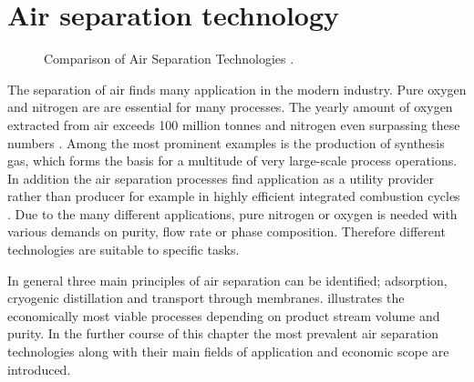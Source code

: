 \chapter{Air separation technology}
\label{chp:airsep}
\begin{figure}[h]
	
	\caption{Comparison of Air Separation Technologies \cite{Prasad.1994}.}
	\label{fig:tech_compar}
\end{figure}
The separation of air finds many application in the modern industry. Pure oxygen and nitrogen are
are essential for many processes. The yearly amount of oxygen extracted from air exceeds 100 million
tonnes and nitrogen even surpassing these numbers \cite{Emsley.2003c2001}. Among the most prominent
examples is the production of synthesis gas,
which forms the basis for a multitude of very large-scale process operations. In addition the
air separation processes find application as a utility provider rather than producer
for example in highly efficient integrated combustion cycles \cite{Mahapatra.2010}. Due to the
many different applications, pure nitrogen or oxygen is needed with various demands on
purity, flow rate or phase composition. Therefore different technologies are suitable to specific tasks.

In general three main principles of air separation can be identified; adsorption,
cryogenic distillation and transport through membranes.  illustrates the
economically most viable processes depending on product stream volume and purity.
In the further course of this chapter the most prevalent  air separation technologies
along with their main fields of application and economic scope are introduced.

